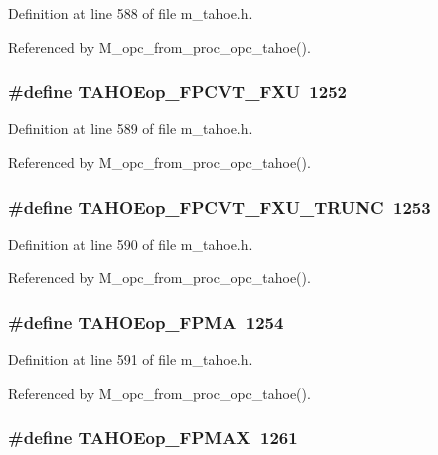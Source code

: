 Definition at line 588 of file m\_\-tahoe.h.

Referenced by M\_\-opc\_\-from\_\-proc\_\-opc\_\-tahoe().
\subsubsection{\setlength{\rightskip}{0pt plus 5cm}\#define TAHOEop\_\-FPCVT\_\-FXU~1252}\label{m__tahoe_8h_89ed873a784145f106e55121a40e0bc0}




Definition at line 589 of file m\_\-tahoe.h.

Referenced by M\_\-opc\_\-from\_\-proc\_\-opc\_\-tahoe().
\subsubsection{\setlength{\rightskip}{0pt plus 5cm}\#define TAHOEop\_\-FPCVT\_\-FXU\_\-TRUNC~1253}\label{m__tahoe_8h_80b17323c3f77b0c851c3a42ca555ccc}




Definition at line 590 of file m\_\-tahoe.h.

Referenced by M\_\-opc\_\-from\_\-proc\_\-opc\_\-tahoe().
\subsubsection{\setlength{\rightskip}{0pt plus 5cm}\#define TAHOEop\_\-FPMA~1254}\label{m__tahoe_8h_c0ec0e4e89e7b2c4e7da6da344e5e0ff}




Definition at line 591 of file m\_\-tahoe.h.

Referenced by M\_\-opc\_\-from\_\-proc\_\-opc\_\-tahoe().
\subsubsection{\setlength{\rightskip}{0pt plus 5cm}\#define TAHOEop\_\-FPMAX~1261}\label{m__tahoe_8h_96a9a2bb5887d83dadf773d0d59c528e}




